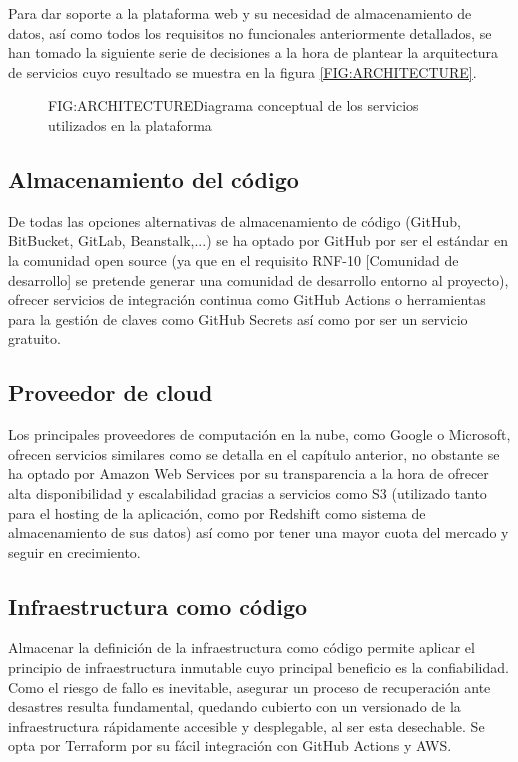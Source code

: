 
Para dar soporte a la plataforma web y su necesidad de almacenamiento de datos, así como todos los requisitos no funcionales anteriormente detallados, se han tomado la siguiente serie de decisiones a la hora de plantear la arquitectura de servicios cuyo resultado se muestra en la figura \ref{FIG:ARCHITECTURE}.

\begin{figure}[Diagrama de arquitectura de la plataforma]{FIG:ARCHITECTURE}{Diagrama conceptual de los servicios utilizados en la plataforma}
\end{figure}

\subsection{Almacenamiento del código}

De todas las opciones alternativas de almacenamiento de código (GitHub, BitBucket, GitLab, Beanstalk,...) se ha optado por GitHub por ser el estándar en la comunidad open source (ya que en el requisito RNF-10 [Comunidad de desarrollo] se pretende generar una comunidad de desarrollo entorno al proyecto), ofrecer servicios de integración continua como GitHub Actions o herramientas para la gestión de claves como GitHub Secrets así como por ser un servicio gratuito.

\subsection{Proveedor de cloud}

Los principales proveedores de computación en la nube, como Google o Microsoft, ofrecen servicios similares como se detalla en el capítulo anterior, no obstante se ha optado por Amazon Web Services por su transparencia a la hora de ofrecer alta disponibilidad y escalabilidad gracias a servicios como S3 (utilizado tanto para el hosting de la aplicación, como por Redshift como sistema de almacenamiento de sus datos) así como por tener una mayor cuota del mercado y seguir en crecimiento.

\subsection{Infraestructura como código}

Almacenar la definición de la infraestructura como código permite aplicar el principio de infraestructura inmutable\cite{InfraAsCode} cuyo principal beneficio es la confiabilidad. Como el riesgo de fallo es inevitable, asegurar un proceso de recuperación ante desastres resulta fundamental, quedando cubierto con un versionado de la infraestructura rápidamente accesible y desplegable, al ser esta desechable. Se opta por Terraform por su fácil integración con GitHub Actions y AWS.

